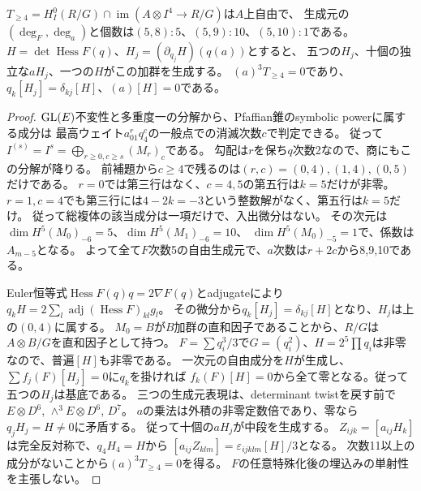 \begin{theorem}[高い横断次数の頂点加群]
\label{thm:pf-vertex-sixteen}
$T_{\ge4}=H^0_I(R/G)\cap\operatorname{im}(A\otimes I^4\to R/G)$は$A$上自由で、
生成元の$(\deg_F,\deg_a)$と個数は$(5,8):5$、$(5,9):10$、$(5,10):1$である。
$H=\det\operatorname{Hess}F(q)$、$H_j=(\partial_{q_j}H)(q(a))$とすると、
五つの$H_j$、十個の独立な$aH_j$、一つの$H$がこの加群を生成する。
$(a)^3T_{\ge4}=0$であり、$q_k[H_j]=\delta_{kj}[H]$、$(a)[H]=0$である。
\end{theorem}
\begin{proof}
$\mathrm{GL}(E)$不変性と多重度一の分解から、Pfaffian錐のsymbolic powerに属する成分は
最高ウェイト$a_{01}^rq_4^c$の一般点での消滅次数$c$で判定できる。
従って$I^{(s)}=I^s=\bigoplus_{r\ge0,c\ge s}(M_r)_c$である。
勾配は$r$を保ち$q$次数2なので、商にもこの分解が降りる。
前補題から$c\ge4$で残るのは$(r,c)=(0,4),(1,4),(0,5)$だけである。
$r=0$では第三行はなく、$c=4,5$の第五行は$k=5$だけが非零。
$r=1,c=4$でも第三行には$4-2k=-3$という整数解がなく、第五行は$k=5$だけ。
従って総複体の該当成分は一項だけで、入出微分はない。
その次元は$\dim H^5(M_0)_{-6}=5$、$\dim H^5(M_1)_{-6}=10$、
$\dim H^5(M_0)_{-5}=1$で、係数は$A_{m-5}$となる。
よって全て$F$次数5の自由生成元で、$a$次数は$r+2c$から8,9,10である。

Euler恒等式$\operatorname{Hess}F(q)q=2\nabla F(q)$とadjugateにより
$q_kH=2\sum_l\operatorname{adj}(\operatorname{Hess}F)_{kl}g_l$。
その微分から$q_k[H_j]=\delta_{kj}[H]$となり、$H_j$は上の$(0,4)$に属する。
$M_0=B$が$B$加群の直和因子であることから、$R/G$は$A\otimes B/G$を直和因子として持つ。
$F=\sum q_i^3/3$で$G=(q_i^2)$、$H=2^5\prod q_i$は非零なので、普遍$[H]$も非零である。
一次元の自由成分を$H$が生成し、$\sum f_j(F)[H_j]=0$に$q_k$を掛ければ
$f_k(F)[H]=0$から全て零となる。従って五つの$H_j$は基底である。
三つの生成元表現は、determinant twistを戻す前で
$E\otimes D^6$, $\wedge^3E\otimes D^6$, $D^7$。
$a$の乗法は外積の非零定数倍であり、零なら$q_jH_j=H\ne0$に矛盾する。
従って十個の$aH_j$が中段を生成する。
$Z_{ijk}=[a_{ij}H_k]$は完全反対称で、$q_4H_4=H$から
$[a_{ij}Z_{klm}]=\varepsilon_{ijklm}[H]/3$となる。
次数11以上の成分がないことから$(a)^3T_{\ge4}=0$を得る。
$F$の任意特殊化後の埋込みの単射性を主張しない。
\end{proof}

